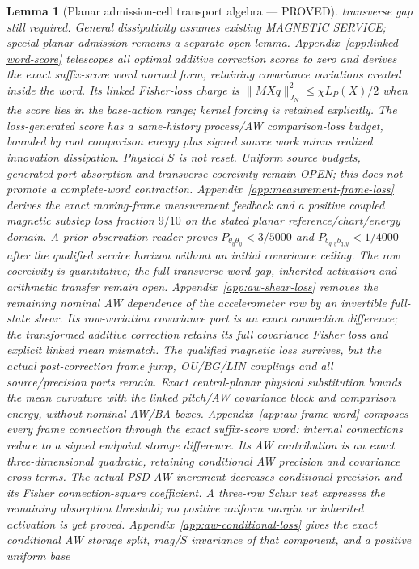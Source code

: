 \documentclass[journal]{IEEEtran}
\newtheorem{lemma}{Lemma}\newtheorem{theorem}{Theorem}\newtheorem{proposition}{Proposition}\newtheorem{remark}{Remark}\newtheorem{corollary}{Corollary}
\begin{document}
\begin{lemma}[Planar admission-cell transport algebra --- PROVED]
transverse gap still required. General dissipativity assumes existing
MAGNETIC SERVICE; special planar admission remains a separate open lemma.
Appendix~\ref{app:linked-word-score} telescopes all optimal additive
correction scores to zero and derives the exact suffix-score word normal
form, retaining covariance variations created inside the word. Its linked
Fisher-loss charge is $\|M X q\|_{J_N}^2\le\chi L_P(X)/2$ when the
score lies in the base-action range; kernel forcing is retained explicitly.
The loss-generated score has a same-history process/AW comparison-loss
budget, bounded by root comparison energy plus signed source work minus
realized innovation dissipation. Physical $S$ is not reset. Uniform source
budgets, generated-port absorption and transverse
coercivity remain OPEN; this does not promote a complete-word contraction.
Appendix~\ref{app:measurement-frame-loss} derives the exact moving-frame
measurement feedback and a positive coupled magnetic substep loss fraction
$9/10$ on the stated planar reference/chart/energy domain. A prior-observation
reader proves $P_{\theta_y\theta_y}<3/5000$ and
$P_{b_{g,y}b_{g,y}}<1/4000$ after the qualified service horizon without an
initial covariance ceiling. The row coercivity is quantitative; the full
transverse word gap, inherited activation and arithmetic transfer remain open.
Appendix~\ref{app:aw-shear-loss} removes the remaining nominal AW dependence
of the accelerometer row by an invertible full-state shear. Its row-variation
covariance port is an exact connection difference; the transformed additive
correction retains its full covariance Fisher loss and explicit linked mean
mismatch. The qualified magnetic loss survives, but the actual post-correction
frame jump, OU/BG/LIN couplings and all source/precision ports remain. Exact
central-planar physical substitution bounds the mean curvature with the linked
pitch/AW covariance block and comparison energy, without nominal AW/BA boxes.
Appendix~\ref{app:aw-frame-word} composes every frame connection through the
exact suffix-score word: internal connections reduce to a signed endpoint
storage difference. Its AW contribution is an exact three-dimensional
quadratic, retaining conditional AW precision and covariance cross terms.
The actual PSD AW increment decreases conditional precision and its Fisher
connection-square coefficient. A three-row Schur test expresses the remaining
absorption threshold; no
positive uniform margin or inherited activation is yet proved.
Appendix~\ref{app:aw-conditional-loss} gives the exact conditional AW storage
split, mag/$S$ invariance of that component, and a positive uniform base

\end{lemma}
\end{document}
